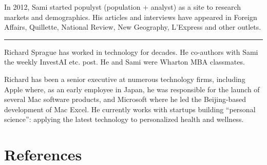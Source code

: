 \documentclass[
  Letterpaper,
]{scrbook}
\begin{document}
In 2012, Sami started populyst (population + analyst) as a site to
research markets and demographics. His articles and interviews have
appeared in Foreign Affairs, Quillette, National Review, New Geography,
L'Express and other outlets.

\begin{center}\rule{0.5\linewidth}{0.5pt}\end{center}

Richard Sprague has worked in technology for decades. He co-authors with
Sami the weekly InvestAI etc. post. He and Sami were Wharton MBA
classmates.

Richard has been a senior executive at numerous technology firms,
including Apple where, as an early employee in Japan, he was responsible
for the launch of several Mac software products, and Microsoft where he
led the Beijing-based development of Mac Excel. He currently works with
startups building ``personal science'': applying the latest technology
to personalized health and wellness.


\chapter*{References}\label{references}

\end{document}
